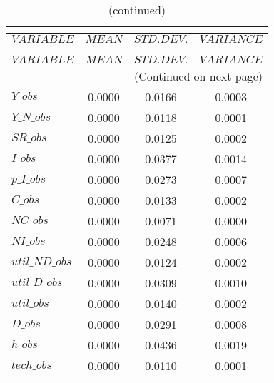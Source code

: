  
\begin{center}
\begin{longtable}{lccc} 
\caption{THEORETICAL MOMENTS}\\
 \label{Table:th_moments}\\
\toprule 
$VARIABLE       $	 & 	 $         MEAN$	 & 	 $    STD. DEV.$	 & 	 $     VARIANCE$\\
\midrule \endfirsthead 
\caption{(continued)}\\
 \toprule \\ 
$VARIABLE       $	 & 	 $         MEAN$	 & 	 $    STD. DEV.$	 & 	 $     VARIANCE$\\
\midrule \endhead 
\midrule \multicolumn{4}{r}{(Continued on next page)} \\ \bottomrule \endfoot 
\bottomrule \endlastfoot 
$Y\_obs         $	 & 	       0.0000	 & 	       0.0166	 & 	       0.0003 \\ 
$Y\_N\_obs      $	 & 	       0.0000	 & 	       0.0118	 & 	       0.0001 \\ 
$SR\_obs        $	 & 	       0.0000	 & 	       0.0125	 & 	       0.0002 \\ 
$I\_obs         $	 & 	       0.0000	 & 	       0.0377	 & 	       0.0014 \\ 
$p\_I\_obs      $	 & 	       0.0000	 & 	       0.0273	 & 	       0.0007 \\ 
$C\_obs         $	 & 	       0.0000	 & 	       0.0133	 & 	       0.0002 \\ 
$NC\_obs        $	 & 	       0.0000	 & 	       0.0071	 & 	       0.0000 \\ 
$NI\_obs        $	 & 	       0.0000	 & 	       0.0248	 & 	       0.0006 \\ 
$util\_ND\_obs  $	 & 	       0.0000	 & 	       0.0124	 & 	       0.0002 \\ 
$util\_D\_obs   $	 & 	       0.0000	 & 	       0.0309	 & 	       0.0010 \\ 
$util\_obs      $	 & 	       0.0000	 & 	       0.0140	 & 	       0.0002 \\ 
$D\_obs         $	 & 	       0.0000	 & 	       0.0291	 & 	       0.0008 \\ 
$h\_obs         $	 & 	       0.0000	 & 	       0.0436	 & 	       0.0019 \\ 
$tech\_obs      $	 & 	       0.0000	 & 	       0.0110	 & 	       0.0001 \\ 
\end{longtable}
 \end{center}
